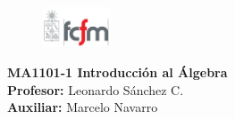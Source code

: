 \documentclass[letterpaper,10pt]{article}
\theoremstyle{plain}
\begin{document}
\newpage
\pagestyle{fancy}
\fancyhf{}

\begin{figure} %
    \vspace{-6mm}
    \includegraphics[width=0.18\textwidth]{img/fcfm2.png}
\end{figure}


\noindent
\textbf{MA1101-1 Introducción al Álgebra}\\
\textbf{Profesor: }Leonardo Sánchez C.\\
\textbf{Auxiliar: }Marcelo Navarro
\end{document}
